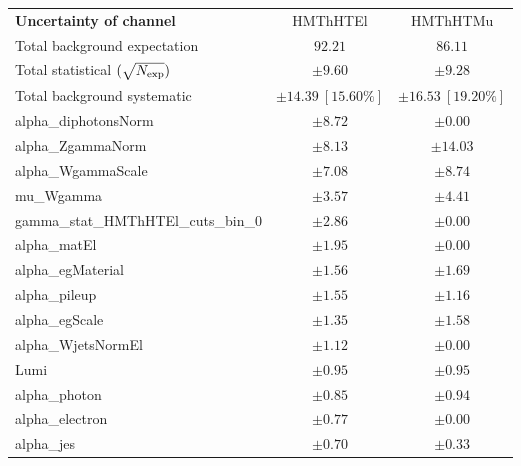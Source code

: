 
\begin{table}
\begin{center}
\setlength{\tabcolsep}{0.0pc}
\begin{tabular*}{\textwidth}{@{\extracolsep{\fill}}lcc}
\noalign{\smallskip}\hline\noalign{\smallskip}
{\bf Uncertainty of channel}                                    & HMThHTEl            & HMThHTMu            \\
\noalign{\smallskip}\hline\noalign{\smallskip}
Total background expectation             &  $92.21$        &  $86.11$       \\
\noalign{\smallskip}\hline\noalign{\smallskip}
Total statistical $(\sqrt{N_{\rm exp}})$              & $\pm 9.60$        & $\pm 9.28$       \\
Total background systematic               & $\pm 14.39\ [15.60\%] $        & $\pm 16.53\ [19.20\%] $             \\
\noalign{\smallskip}\hline\noalign{\smallskip}
\noalign{\smallskip}\hline\noalign{\smallskip}
alpha\_diphotonsNorm         & $\pm 8.72$          & $\pm 0.00$       \\
alpha\_ZgammaNorm         & $\pm 8.13$          & $\pm 14.03$       \\
alpha\_WgammaScale         & $\pm 7.08$          & $\pm 8.74$       \\
mu\_Wgamma         & $\pm 3.57$          & $\pm 4.41$       \\
gamma\_stat\_HMThHTEl\_cuts\_bin\_0         & $\pm 2.86$          & $\pm 0.00$       \\
alpha\_matEl         & $\pm 1.95$          & $\pm 0.00$       \\
alpha\_egMaterial         & $\pm 1.56$          & $\pm 1.69$       \\
alpha\_pileup         & $\pm 1.55$          & $\pm 1.16$       \\
alpha\_egScale         & $\pm 1.35$          & $\pm 1.58$       \\
alpha\_WjetsNormEl         & $\pm 1.12$          & $\pm 0.00$       \\
Lumi         & $\pm 0.95$          & $\pm 0.95$       \\
alpha\_photon         & $\pm 0.85$          & $\pm 0.94$       \\
alpha\_electron         & $\pm 0.77$          & $\pm 0.00$       \\
alpha\_jes         & $\pm 0.70$          & $\pm 0.33$       \\

\end{tabular*}
\end{center}
\end{table}
